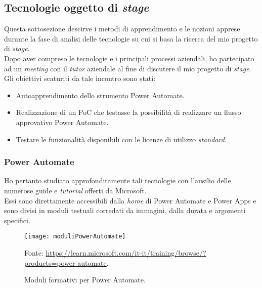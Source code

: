 \subsection{Tecnologie oggetto di \emph{stage}}
Questa sottosezione descirve i metodi di apprendimento e le nozioni apprese durante la fase di analisi delle tecnologie su cui si basa la ricerca del mio progetto di \emph{stage}.\\
Dopo aver compreso le tecnologie e i principali processi aziendali, ho partecipato ad un \emph{meeting} con il \emph{tutor} aziendale al fine di discutere il mio progetto di \emph{stage}.\\
Gli obiettivi scaturiti da tale incontro sono stati: 
\begin{itemize}
    \item Autoapprendimento dello strumento Power Automate.
    \item Realizzazione di un PoC che testasse la possibilità di realizzare un flusso approvativo Power Automate. 
    \item Testare le funzionalità disponibili con le licenze di utilizzo \emph{standard}. 
\end{itemize}

\subsubsection*{Power Automate}
Ho pertanto studiato approfonditamente tali tecnologie con l'ausilio delle numerose guide e \emph{tutorial} offerti da Microsoft.\\
Essi sono direttamente accessibili dalla \emph{home} di Power Automate e Power Apps e sono divisi in moduli testuali corredati da immagini, dalla durata e argomenti specifici. 

\begin{figure}[htbp] 
    \centering 
    \texttt{[image: moduliPowerAutomate]} 
    \caption{Moduli formativi per Power Automate.}
    \label{fig:moduliPowerAutomate}
    \vspace{1mm}
    Fonte: \url{https://learn.microsoft.com/it-it/training/browse/?products=power-automate}.
\end{figure}

